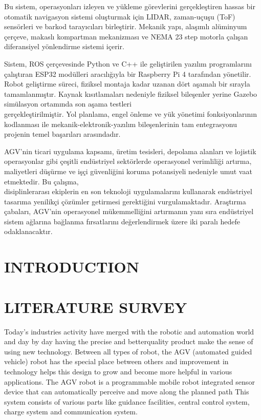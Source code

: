 \documentclass[main]{subfiles}
\begin{document}
Bu sistem, operasyonları izleyen ve yükleme görevlerini gerçekleştiren hassas bir otomatik navigasyon sistemi oluşturmak için LIDAR, zaman-uçuşu (ToF) sensörleri ve barkod tarayıcıları birleştirir. 
Mekanik yapı, alaşımlı alüminyum çerçeve, makaslı kompartman mekanizması ve NEMA 23 step motorla çalışan diferansiyel yönlendirme sistemi içerir.

Sistem, ROS çerçevesinde Python ve C++ ile geliştirilen yazılım programlarını çalıştıran ESP32 modülleri aracılığıyla bir Raspberry Pi 4 tarafından yönetilir. 
Robot geliştirme süreci, fiziksel montaja kadar uzanan dört aşamalı bir sırayla tamamlanmıştır. 
Kaynak kısıtlamaları nedeniyle fiziksel bileşenler yerine Gazebo simülasyon ortamında son aşama testleri \\ gerçekleştirilmiştir. 
Yol planlama, engel önleme ve yük yönetimi fonksiyonlarının kodlanması ile mekanik-elektronik-yazılım bileşenlerinin tam entegrasyonu projenin temel başarıları arasındadır.

AGV'nin ticari uygulama kapsamı, üretim tesisleri, depolama alanları ve lojistik operasyonlar gibi çeşitli endüstriyel sektörlerde operasyonel verimliliği artırma, maliyetleri düşürme ve işçi güvenliğini koruma potansiyeli nedeniyle umut vaat etmektedir. 
Bu çalışma,\\ disiplinlerarası ekiplerin en son teknoloji uygulamalarını kullanarak endüstriyel tasarıma yenilikçi çözümler getirmesi gerektiğini vurgulamaktadır. Araştırma çabaları, AGV'nin operasyonel mükemmelliğini artırmanın yanı sıra endüstriyel sistem ağlarına bağlanma fırsatlarını değerlendirmek üzere iki paralı hedefe odaklanacaktır.
\justifying

\newpage
\centering
\tableofcontents
\newpage

\listoffigures
\newpage

\listoftables
\newpage

\listofcodeblocks
\newpage
\chapter{\hfil INTRODUCTION \hfil}
\justifying

\newpage
\centering
\chapter{\hfil LITERATURE SURVEY \hfil}
\justifying
Today’s industries activity have merged
with the robotic and automation world and
day by day having the precise and betterquality
product make the sense of using
new technology. Between all types of
robot, the AGV (automated guided
vehicle) robot has the special place
between others and improvement in
technology helps this design to grow and
become more helpful in various
applications. The AGV robot is a
programmable mobile robot integrated
sensor device that can automatically
perceive and move along the planned
path\cite{das2016design} This system consists of various
parts like guidance facilities, central
control system, charge system and
communication system\cite{moshayedi2019agv}. 
\end{document}
